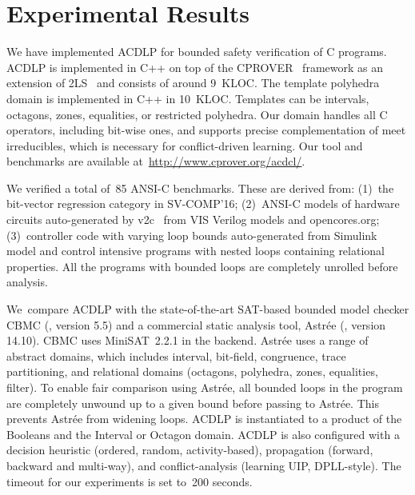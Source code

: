 \section{Experimental Results}

We have implemented ACDLP for bounded safety verification of C programs.  
ACDLP is implemented in C++ on top of the
\textsc{CPROVER}~\cite{cprover} framework as an extension of 2LS~\cite{2ls}
and consists of around 9~KLOC. 
The template polyhedra domain is implemented in C++ in 10~KLOC.  Templates
can be intervals, octagons, zones, equalities, or restricted polyhedra.  Our
domain handles all C operators, including bit-wise ones, and supports
precise complementation of meet irreducibles, which is necessary for
conflict-driven learning.  Our tool and benchmarks are available 
at~\url{http://www.cprover.org/acdcl/}.

We verified a total of~85 ANSI-C benchmarks.  These are derived from:
(1)~the bit-vector regression category in SV-COMP'16; (2)~ANSI-C models of
hardware circuits auto-generated by v2c~\cite{mtk2016} from VIS Verilog
models and opencores.org; (3)~controller code with varying loop bounds 
auto-generated from Simulink model and control 
intensive programs with nested loops containing relational properties. 
All the programs with bounded loops are completely unrolled before
analysis.  

We~compare ACDLP with the state-of-the-art SAT-based bounded model checker
CBMC (\cite{cbmc}, version 5.5) and a commercial static analysis tool,
Astr{\'e}e (\cite{astree}, version 14.10).  CBMC uses MiniSAT~2.2.1 in the
backend.  Astr{\'e}e uses a range of abstract domains, which includes
interval, bit-field, congruence, trace partitioning, and relational domains
(octagons, polyhedra, zones, equalities, filter).  To enable fair comparison
using Astr{\'e}e, all bounded loops in the program are completely unwound up
to a given bound before passing to Astr{\'e}e.  This prevents Astr{\'e}e
from widening loops.
%
ACDLP is instantiated to a product of the Booleans and the Interval or
Octagon domain.  ACDLP is also configured with a decision heuristic 
(ordered, random, activity-based), propagation (forward, backward and multi-way), 
and conflict-analysis (learning UIP, DPLL-style).  The timeout for our
experiments is set to~200 seconds.
%


